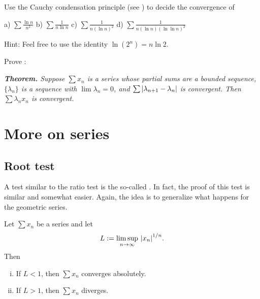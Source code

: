 \begin{exercise}
Use the Cauchy condensation principle
(see )
to decide the convergence of

\medskip

\noindent
a) $\displaystyle \sum \frac{\ln n}{n^2}$
\qquad
b) $\displaystyle \sum \frac{1}{n \ln n}$
\qquad
c) $\displaystyle \sum \frac{1}{n {(\ln n)}^2}$
\qquad
d) $\displaystyle \sum \frac{1}{n (\ln n ){(\ln \ln n)}^2}$

\medskip

\noindent
Hint: Feel free to use the identity $\ln (2^n) = n \ln 2$.
\end{exercise}

\begin{exercise}[Challenging]
Prove \emph{}:

\medskip

\noindent
\emph{\textbf{Theorem.} Suppose $\sum x_n$ is a series whose partial sums
are a bounded sequence, $\{ \lambda_n \}$ is a sequence with $\lim \lambda_n = 0$, and
$\sum \left\lvert { \lambda_{n+1} - \lambda_n } \right\rvert$ is convergent.
Then $\sum \lambda_n x_n$ is convergent.}
\end{exercise}




\sectionnewpage
\section{More on series}
\label{sec:moreonseries}


\subsection{Root test}

A test similar to the ratio test is the so-called
\emph{}.  In fact, the 
proof of this test is similar and somewhat easier.
Again, the idea is to generalize what happens for the geometric series.

\begin{prop}
Let $\sum x_n$ be a series and let
\begin{equation*}
L := \limsup_{n\to\infty} \, {\left\lvert {x_n} \right\rvert}^{1/n} .
\end{equation*}
Then
\begin{enumerate}[(i)]
\item If $L < 1$, then $\sum x_n$ converges absolutely.
\item If $L > 1$, then $\sum x_n$ diverges.
\end{enumerate}
\end{prop}

